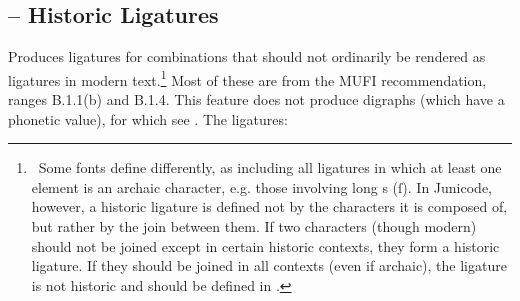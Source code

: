 \subsection{ -- Historic Ligatures}

Produces ligatures for combinations that should not ordinarily be rendered as
ligatures in modern text.\footnote{\ Some
fonts define  differently, as including all ligatures in which at least one
element is an archaic character, e.g.
those involving long s (\textrm{ſ\hspace{0.2em}}). In Junicode, however, a
historic ligature is defined not by the characters it is composed of, but
rather by the join between them. If two characters (though modern) should not be joined except
in certain historic contexts, they form a historic ligature. If they should be
joined in all contexts (even if archaic), the ligature is not historic
and should be defined in .} Most of these are from the MUFI recommendation,
ranges B.1.1(b) and B.1.4. This feature does
not produce digraphs (which have a phonetic value), for which see
. The ligatures:

